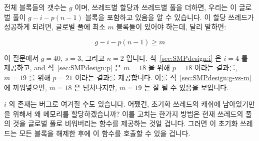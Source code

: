 {{	전체 블록들의 갯수는 $g$ 이며, 쓰레드별 할당과 쓰레드별 풀을 더하면,
	우리는 이 글로벌 풀이 $g-i-p(n-1)$ 블록을 포함하고 있음을 알 수
	있습니다.
	이 할당 쓰레드가 성공하게 되려면, 글로벌 풀에 최소 $m$ 블록들이 있어야
	하는데, 달리 말하면:

	\begin{equation}
		g - i - p(n - 1) \ge m
	\label{sec:SMPdesign:g-vs-m}
	\end{equation}

	이 질문에서 $g=40$, $s=3$, 그리고 $n=2$ 입니다.
	식~\ref{sec:SMPdesign:i} 은 $i=4$ 를 제공하고, and
	식~\ref{sec:SMPdesign:p} 은 $m=18$ 을 위해 $p=18$ 이라는 결과를, $m=19$
	를 위해 $p=21$ 이라는 결과를 제공합니다.
	이를 식~\ref{sec:SMPdesign:g-vs-m} 에 끼워넣으면, $m=18$ 은 넘쳐나지만,
	$m=19$ 는 잘 될 수 있음을 보입니다.

	$i$ 의 존재는 버그로 여겨질 수도 있습니다.
	어쨌건, 초기화 쓰레드의 캐쉬에 남아있기만을 위해서 왜 메모리를
	할당하겠습니까?
	이를 고치는 한가지 방법은 현재 쓰레드의 풀의 것을 글로벌 풀로
	비워버리는  함수를 제공하는 것일 겁니다.
	그러면 이 초기화 쓰레드는 모든 블록을 해제한 후에 이 함수를 호출할 수
	있을 겁니다.

}\QuickQuizEndE
}

